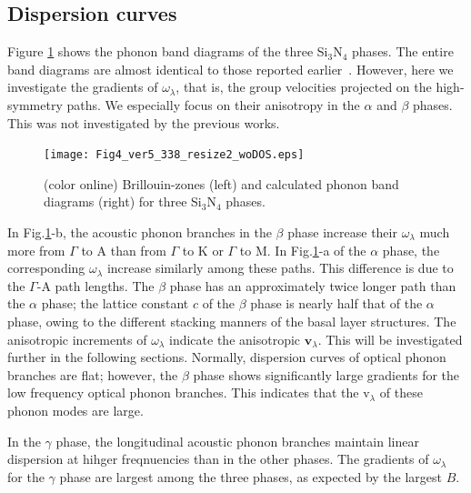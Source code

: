 \documentclass[twocolumn,amsmath,amssymb,a4paper,prb,superscriptaddress,floatfix]{revtex4-1}
\begin{document}
\subsection{Dispersion curves}

Figure \ref{fig:Fig4_ver5_338} shows the phonon band diagrams of the three
Si$_3$N$_4$ phases. The entire band diagrams are almost identical to those
reported earlier~\cite{kuwabara,xu}. However, here we investigate the gradients
of $\omega_\lambda$, that is, the group velocities projected on the
high-symmetry paths. We especially focus on their anisotropy in the $\alpha$ and
$\beta$ phases. This was not investigated by the previous works.

\begin{figure}[ht]
	 \begin{center}
		   \texttt{[image: Fig4\_ver5\_338\_resize2\_woDOS.eps]}
		     \caption{(color online) Brillouin-zones (left) and calculated phonon band diagrams (right) for three Si$_3$N$_4$ phases.
		   \label{fig:Fig4_ver5_338} }
    \end{center}
\end{figure}

In Fig.\ref{fig:Fig4_ver5_338}-b, the acoustic phonon branches in the $\beta$
phase increase their $\omega_\lambda$ much more from $\Gamma$ to A than from
$\Gamma$ to K or $\Gamma$ to M. In Fig.\ref{fig:Fig4_ver5_338}-a of the
$\alpha$ phase, the corresponding $\omega_\lambda$ increase similarly among
these paths.  This difference is due to the $\Gamma$-A path lengths.  The
$\beta$ phase has an approximately twice longer path than the $\alpha$ phase;
the lattice constant $c$ of the $\beta$ phase is nearly half that of the
$\alpha$ phase, owing to the different stacking manners of the basal layer
structures.  The anisotropic increments of $\omega_\lambda$ indicate the
anisotropic $\mathbf{v}_\lambda$.  This will be investigated further in the
following sections.  Normally, dispersion curves of optical phonon branches are
flat; however, the $\beta$ phase shows significantly large gradients for the
low frequency optical phonon branches.  This indicates that the
\rm{v}$_{\lambda}$ of these phonon modes are large.

In the $\gamma$ phase, the longitudinal acoustic phonon branches maintain
linear dispersion at hihger freqnuencies than in the other phases.  The
gradients of $\omega_\lambda$ for the $\gamma$ phase are largest among the
three phases, as expected by the largest $B$.
\end{document}
